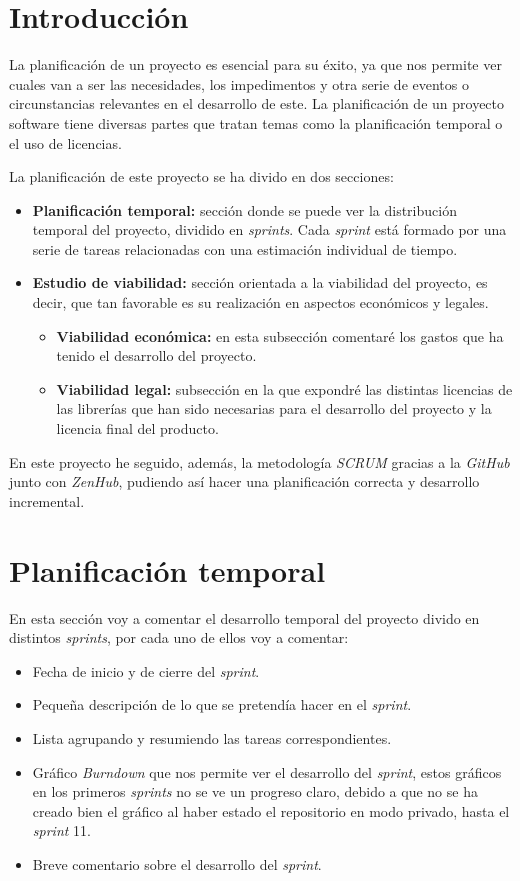
\section{Introducción}
La planificación de un proyecto es esencial para su éxito, ya que nos permite ver cuales van a ser las necesidades, los impedimentos y otra serie de eventos o circunstancias relevantes en el desarrollo de este. La planificación de un proyecto software tiene diversas partes que tratan temas como la planificación temporal o el uso de licencias.

La planificación de este proyecto se ha divido en dos secciones:
\begin{itemize}
	\item \textbf{Planificación temporal:} sección donde se puede ver la distribución temporal del proyecto, dividido en \textit{sprints}. Cada \textit{sprint} está formado por una serie de tareas relacionadas con una estimación individual de tiempo. 
	\item \textbf{Estudio de viabilidad:} sección orientada a la viabilidad del proyecto, es decir, que tan favorable es su realización en aspectos económicos y legales.
	\begin{itemize}
		\item \textbf{Viabilidad económica:} en esta subsección comentaré los gastos que ha tenido el desarrollo del proyecto.
		\item \textbf{Viabilidad legal:} subsección en la que expondré las distintas licencias de las librerías que han sido necesarias para el desarrollo del proyecto y la licencia final del producto.
	\end{itemize}
\end{itemize}

En este proyecto he seguido, además, la metodología \textit{SCRUM} gracias a la \textit{GitHub} junto con \textit{ZenHub}, pudiendo así hacer una planificación correcta y desarrollo incremental.
\section{Planificación temporal}
En esta sección voy a comentar el desarrollo temporal del proyecto divido en distintos \textit{sprints}, por cada uno de ellos voy a comentar:
\begin{itemize}
	\item Fecha de inicio y de cierre del \textit{sprint}.
	\item Pequeña descripción de lo que se pretendía hacer en el \textit{sprint}.
	\item Lista agrupando y resumiendo las tareas correspondientes.
	\item Gráfico \textit{Burndown} que nos permite ver el desarrollo del \textit{sprint}, estos gráficos en los primeros \textit{sprints} no se ve un progreso claro, debido a que no se ha creado bien el gráfico al haber estado el repositorio en modo privado, hasta el \textit{sprint} 11.
	\item Breve comentario sobre el desarrollo del \textit{sprint}.
\end{itemize}

